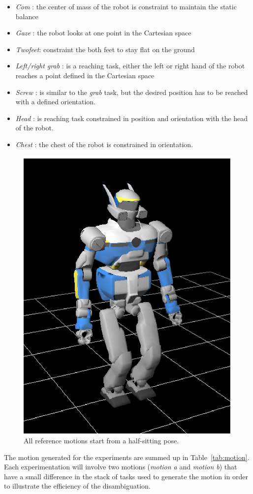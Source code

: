 \documentclass[letterpaper, 10pt, conference]{ieeeconf}      %
\begin{document}
\begin{itemize}
  \item \emph{Com} : the center of mass of the robot is constraint to maintain the static balance
  \item \emph{Gaze} : the robot looks at one point in the Cartesian space
  \item \emph{Twofeet}: constraint the both feet to stay flat on the ground
  \item \emph{Left/right grab} : is a reaching task, either the left or right hand
of the robot reaches a point defined in the Cartesian space
  \item \emph{Screw} : is similar to the \emph{grab} task, but the desired position
has to be reached with a defined orientation.
  \item \emph{Head} : is reaching task constrained in position and orientation with the head of the
    robot.
  \item \emph{Chest} : the chest of the robot is constrained in orientation.  
\end{itemize}
\begin{figure}[t]
\begin{center}
\includegraphics[width=0.3\linewidth]{img/halfSit.ps}
\end{center}
\caption{All reference motions start from a half-sitting pose.}
\label{fig:halfSit}
\end{figure}

The motion generated for the experiments are summed up in Table~\ref{tab:motion}.
Each experimentation will involve two motions (\emph{motion a} and \emph{motion b}) 
that have a small difference in the
stack of tasks used to generate the motion in order to illustrate
the efficiency of the disambiguation.
\end{document}
